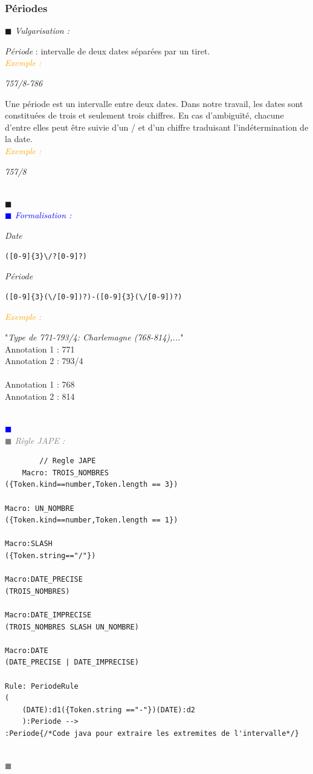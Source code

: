 \documentclass[a4paper, 11pt]{report}
\newenvironment{vulgarisation}
    {
    \textit{\textcolor{dark-blue}{$\blacksquare$  Vulgarisation : \\}}

    }
    {
    ~\\\textcolor{dark-blue}{$\blacksquare$}\\
    }
\newenvironment{formalisation}
    {
    \textit{\textcolor{blue}{$\blacksquare$  Formalisation : \\}}
    }
    {
    ~\\\textcolor{blue}{$\blacksquare$}\\
    }
\newenvironment{codage}
    {
    \textit{\textcolor{gray}{$\blacksquare$  Règle JAPE : \\}}
    }
    {
    ~\\\textcolor{gray}{$\blacksquare$}\\
    }
\newenvironment{exemple}
    {
    \textit{\textcolor{orange}{
    Exemple : \\}}
    }
    {~\\
    }
\begin{document}
    \subsubsection{Périodes}
\begin{vulgarisation}
    \textit{Période} : intervalle de deux dates séparées par un tiret.\\
    \begin{exemple}
        \textit{757/8-786}
    \end{exemple}
    
    Une période est un intervalle entre deux dates. Dans notre travail, les dates sont constituées de trois et seulement trois chiffres. En cas d'ambiguïté, chacune d'entre elles peut être suivie d'un \og/\fg{} et d'un chiffre traduisant l'indétermination de la date.\\
    \begin{exemple}
        \textit{757/8}
    \end{exemple}
    
\end{vulgarisation}
\begin{formalisation}
    \textit{Date}
    \begin{verbatim}
([0-9]{3}\/?[0-9]?)
    \end{verbatim}
    \textit{Période}
    \begin{verbatim}
([0-9]{3}(\/[0-9])?)-([0-9]{3}(\/[0-9])?)
    \end{verbatim}
    \begin{exemple}
        "\emph{Type de 771-793/4: Charlemagne (768-814),...}" \\
        Annotation 1 : 771 \\
        Annotation 2 : 793/4\\\\\noindent
        Annotation 1 : 768 \\
        Annotation 2 : 814
    \end{exemple}
\end{formalisation}
    \begin{codage}
    \begin{lstlisting}
        // Regle JAPE
    Macro: TROIS_NOMBRES
({Token.kind==number,Token.length == 3})

Macro: UN_NOMBRE
({Token.kind==number,Token.length == 1})

Macro:SLASH
({Token.string=="/"})

Macro:DATE_PRECISE
(TROIS_NOMBRES)

Macro:DATE_IMPRECISE
(TROIS_NOMBRES SLASH UN_NOMBRE)

Macro:DATE
(DATE_PRECISE | DATE_IMPRECISE)

Rule: PeriodeRule
(
    (DATE):d1({Token.string =="-"})(DATE):d2
    ):Periode -->
:Periode{/*Code java pour extraire les extremites de l'intervalle*/}
    \end{lstlisting}
    \end{codage}
    
\end{document}
